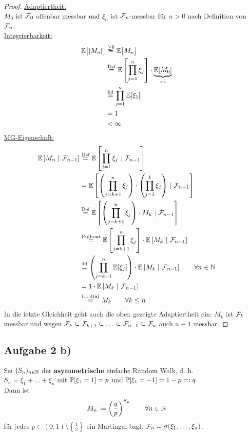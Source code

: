 \documentclass[12pt,a4paper]{article}
\begin{document}
\begin{proof}
	\underline{Adaptiertheit:}\\
	$M_0$ ist $\F_0$ offenbar messbar und
	$\xi_n$ ist $\F_n$-messbar für $n>0$ nach Definition von $\F_n$.	\\
	
	 \underline{Integrierbarkeit:}
	\begin{align*}
		\E\big[|M_n|\big]
		&\stackeq{\geq0}\E\big[M_n\big]\\
		&\stackeq{\text{Def}}\E\left[\prod_{j=1}^n \xi_j\right]\cdot\underbrace{\E[M_0]}_{=1} \\
		&\stackeq{\text{iid}}\prod_{j=1}^n \E[\xi_1] \\
		&= 1 \\
		&<\infty
	\end{align*}
	\underline{MG-Eigenschaft:}
	\begin{align*}
		\BedE{M_n}{\F_{n-1}}
		&\stackeq{\text{Def}} \BedE{\prod_{j=1}^n \xi_j}{\F_{n-1}} \\
		&\stackeq{} \BedE{\left(\prod_{j=k+1}^n \xi_j\right)\cdot\left(\prod_{j=1}^k \xi_j\right)}{\F_{n-1}} \\
		&\stackeq{\text{Def}} \BedE{\left(\prod_{j=k+1}^n \xi_j\right)\cdot M_k}{\F_{n-1}} \\
		&\stackeq{\text{Pull-out}} \E\left[\prod_{j=k+1}^n \xi_j\right]\cdot\BedE{M_{k}}{\F_{n-1}} \\
		&\stackeq{\text{iid}} \left(\prod_{j=k+1}^n\E[\xi_j]\right) \cdot \BedE{M_{k}}{\F_{n-1}}\qquad\forall n\in\N\\
		&= 1\cdot \BedE{M_{k}}{\F_{n-1}}\\
		&\stackeq{\text{1.1.4(a)}} M_{k}\qquad\forall k\leq n
	\end{align*}
In die letzte Gleichheit geht auch die oben gezeigte Adaptiertheit ein: $M_k$ ist $\F_k$ messbar und wegen $\F_{k}\subseteq \F_{k+1}\subseteq\ldots\subseteq \F_{n-1}\subseteq\F_n$ auch $n-1$ messbar.
\end{proof}

\subsection*{Aufgabe 2 b)}
Sei $(S_n)_{n\in\N}$ der \textbf{asymmetrische} einfache Random Walk, d. h.\\ $S_n=\xi_1+\ldots+\xi_n$ mit $\P[\xi_1=1]=p$ und $\P[\xi_1=-1]=1-p=:q$.\\
Dann ist 
\begin{align*}
M_n:=\left(\frac{q}{p}\right)^{S_n}\qquad\forall n\in\N
\end{align*}
für jedes $p\in (0,1)\setminus\left\lbrace\frac{1}{2}\right\rbrace$ ein Martingal bzgl. $\F_n=\sigma(\xi_1,\ldots,\xi_n)$.
\end{document}

